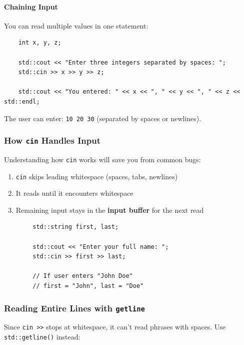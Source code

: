 \paragraph{Chaining Input}

You can read multiple values in one statement:

\begin{lstlisting}
	int x, y, z;
	
	std::cout << "Enter three integers separated by spaces: ";
	std::cin >> x >> y >> z;
	
	std::cout << "You entered: " << x << ", " << y << ", " << z << std::endl;
\end{lstlisting}

The user can enter: \texttt{10 20 30} (separated by spaces or newlines).

\subsubsection{How \texttt{cin} Handles Input}

Understanding how \texttt{cin} works will save you from common bugs:

\begin{enumerate}
	\item \texttt{cin} skips leading whitespace (spaces, tabs, newlines)
	\item It reads until it encounters whitespace
	\item Remaining input stays in the \textbf{input buffer} for the next read
\end{enumerate}

\begin{example}{\leavevmode}
	
	\begin{lstlisting}
		std::string first, last;
		
		std::cout << "Enter your full name: ";
		std::cin >> first >> last;
		
		// If user enters "John Doe"
		// first = "John", last = "Doe"
	\end{lstlisting}
\end{example}

\subsubsection{Reading Entire Lines with \texttt{getline}}

Since \texttt{cin >>} stops at whitespace, it can't read phrases with spaces. Use \texttt{std::getline()} instead:

